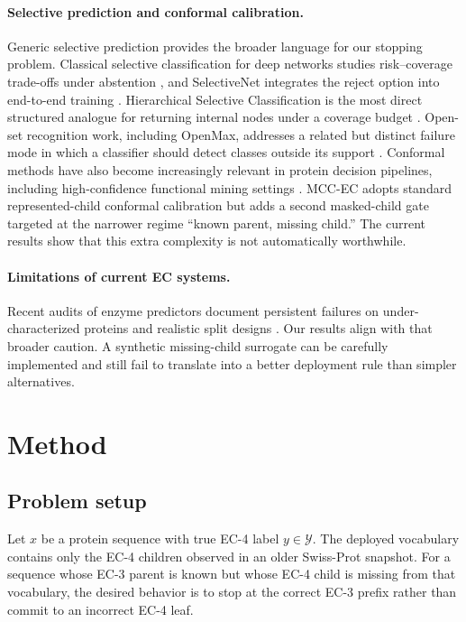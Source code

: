 \documentclass{article}
\newcommand{\method}{MCC-EC\xspace}
\begin{document}
\paragraph{Selective prediction and conformal calibration.}
Generic selective prediction provides the broader language for our stopping problem. Classical selective classification for deep networks studies risk--coverage trade-offs under abstention \citep{Geifman_2017}, and SelectiveNet integrates the reject option into end-to-end training \citep{Geifman_2019}. Hierarchical Selective Classification is the most direct structured analogue for returning internal nodes under a coverage budget \citep{goren2024hierarchical}. Open-set recognition work, including OpenMax, addresses a related but distinct failure mode in which a classifier should detect classes outside its support \citep{Bendale_2016_CVPR}. Conformal methods have also become increasingly relevant in protein decision pipelines, including high-confidence functional mining settings \citep{Boger_2025}. \method adopts standard represented-child conformal calibration but adds a second masked-child gate targeted at the narrower regime ``known parent, missing child.'' The current results show that this extra complexity is not automatically worthwhile.

\paragraph{Limitations of current EC systems.}
Recent audits of enzyme predictors document persistent failures on under-characterized proteins and realistic split designs \citep{deCrecyLagard_2025,Capela_2025}. Our results align with that broader caution. A synthetic missing-child surrogate can be carefully implemented and still fail to translate into a better deployment rule than simpler alternatives.

\section{Method}
\label{sec:method}

\subsection{Problem setup}

Let $x$ be a protein sequence with true EC-4 label $y \in \mathcal{Y}$. The deployed vocabulary contains only the EC-4 children observed in an older Swiss-Prot snapshot. For a sequence whose EC-3 parent is known but whose EC-4 child is missing from that vocabulary, the desired behavior is to stop at the correct EC-3 prefix rather than commit to an incorrect EC-4 leaf.
\end{document}

